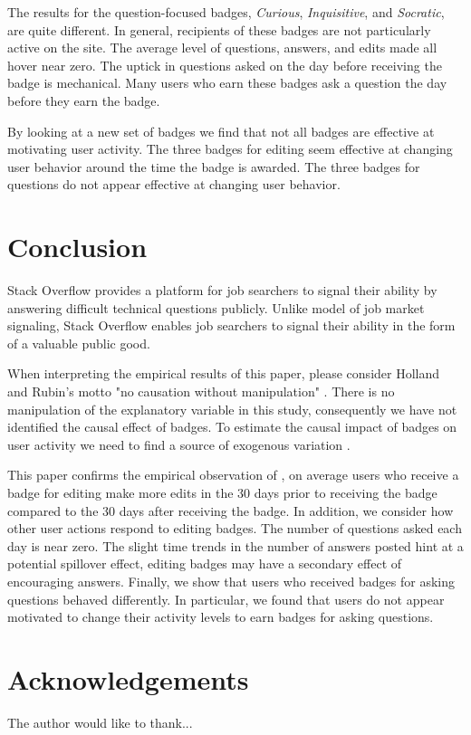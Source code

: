 \documentclass[conference]{IEEEtran}
\newcommand{\1}{\mathds{1}}
\begin{document}
The results for the question-focused badges, \textit{Curious}, \textit{Inquisitive}, and \textit{Socratic}, are quite different. In general, recipients of these badges are not particularly active on the site. The average level of questions, answers, and edits made all hover near zero. The uptick in questions asked on the day before receiving the badge is mechanical. Many users who earn these badges ask a question the day before they earn the badge.

By looking at a new set of badges we find that not all badges are effective at motivating user activity. The three badges for editing seem effective at changing user behavior around the time the badge is awarded. The three badges for questions do not appear effective at changing user behavior.

\section{Conclusion}

Stack Overflow provides a platform for job searchers to signal their ability by answering difficult technical questions publicly. Unlike \citet{Spence1973} model of job market signaling, Stack Overflow enables job searchers to signal their ability in the form of a valuable public good.

When interpreting the empirical results of this paper, please consider Holland and Rubin's motto "no causation without manipulation" \citep{Holland1986}. There is no manipulation of the explanatory variable in this study, consequently we have not identified the causal effect of badges. To estimate the causal impact of badges on user activity we need to find a source of exogenous variation \citep{Miller2013}.

This paper confirms the empirical observation of \citet{Grant2013}, on average users who receive a badge for editing make more edits in the 30 days prior to receiving the badge compared to the 30 days after receiving the badge. In addition, we consider how other user actions respond to editing badges. The number of questions asked each day is near zero. The slight time trends in the number of answers posted hint at a potential spillover effect, editing badges may have a secondary effect of encouraging answers. Finally, we show that users who received badges for asking questions behaved differently. In particular, we found that users do not appear motivated to change their activity levels to earn badges for asking questions.

\section*{Acknowledgements}

The author would like to thank...

\nocite{Antin2011, MSRChallenge2015, se-dump}

\renewcommand{\bibfont}{\small}


\end{document}
